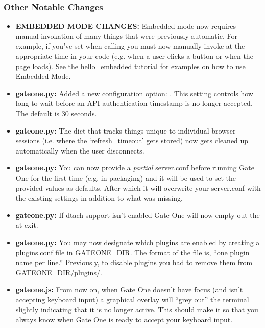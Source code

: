 \documentclass[letterpaper,10pt,openany]{sphinxmanual}
\begin{document}
\subsubsection{Other Notable Changes}
\label{ReleaseNotes/index:other-notable-changes}\begin{itemize}
\item {} 
\textbf{EMBEDDED MODE CHANGES:}  Embedded mode now requires manual invokation of many things that were previously automatic.  For example, if you've set  when calling {\hyperref[Developer/js_gateone:GateOne.init]{}} you must now manually invoke {\hyperref[Applications/terminal/js_terminal:GateOne.Terminal.newTerminal]{}} at the appropriate time in your code (e.g. when a user clicks a button or when the page loads).  See the hello\_embedded tutorial for examples on how to use Embedded Mode.

\item {} 
\textbf{gateone.py:}  Added a new configuration option:  .  This setting controls how long to wait before an API authentication timestamp is no longer accepted.  The default is 30 seconds.

\item {} 
\textbf{gateone.py:}  The dict that tracks things unique to individual browser sessions (i.e. where the `refresh\_timeout' gets stored) now gets cleaned up automatically when the user disconnects.

\item {} 
\textbf{gateone.py:}  You can now provide a \emph{partial} server.conf before running Gate One for the first time (e.g. in packaging) and it will be used to set the provided values as defaults.  After which it will overwrite your server.conf with the existing settings in addition to what was missing.

\item {} 
\textbf{gateone.py:}  If dtach support isn't enabled Gate One will now empty out the  at exit.

\item {} 
\textbf{gateone.py:}  You may now designate which plugins are enabled by creating a plugins.conf file in GATEONE\_DIR.  The format of the file is, ``one plugin name per line.''  Previously, to disable plugins you had to remove them from GATEONE\_DIR/plugins/.

\item {} 
\textbf{gateone.js:}  From now on, when Gate One doesn't have focus (and isn't accepting keyboard input) a graphical overlay will ``grey out'' the terminal slightly indicating that it is no longer active.  This should make it so that you always know when Gate One is ready to accept your keyboard input.


\end{itemize}
\end{document}
